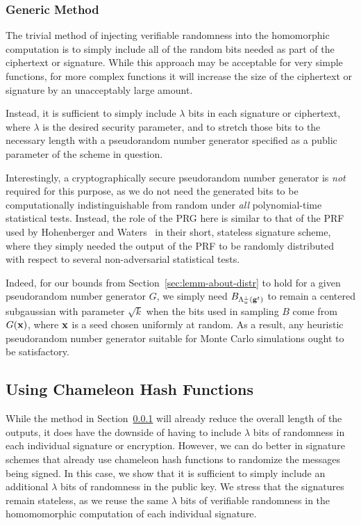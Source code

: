 \subsubsection{Generic Method}
\label{sec:generic-method}
The trivial method of injecting verifiable randomness into the
homomorphic computation is to simply include all of the random bits
needed as part of the ciphertext or signature. While this approach may
be acceptable for very simple functions, for more complex functions it
will increase the size of the ciphertext or signature by an
unacceptably large amount. 

Instead, it is sufficient to simply include $\lambda$ bits in each
signature or ciphertext, where
$\lambda$ is the desired security parameter, and to stretch those bits
to the necessary length with a pseudorandom number generator specified as a
public parameter of the scheme in question. 

Interestingly, a cryptographically secure pseudorandom number
generator is \emph{not} required for this purpose, as we do not need
the generated bits to be computationally indistinguishable from random
under \emph{all} polynomial-time statistical tests. Instead, the role
of the PRG here is similar to that of the PRF used by Hohenberger and
Waters~\cite{DBLP:conf/crypto/HohenbergerW09} in their short,
stateless signature scheme, where they simply needed the output of the
PRF to be randomly distributed with respect to several non-adversarial
statistical tests.

Indeed, for our bounds from Section~\ref{sec:lemm-about-distr} to hold for
a given pseudorandom number generator $G$, we simply need
$B_{\Lambda^{\perp}_{u}(\mathbf{g}^t)}$ to remain a centered subgaussian with
parameter $\sqrt{k}$ when the bits used in sampling $B$ come from
$G(\mathbf{x})$, where $\mathbf{x}$ is a seed chosen uniformly at random. As a
result, any heuristic pseudorandom number generator suitable for Monte
Carlo simulations ought to be satisfactory.

\subsection{Using  Chameleon Hash Functions}
\label{sec:using-chameleon-hash}

While the method in Section~\ref{sec:generic-method} will already
reduce the overall length of the outputs, it does have the downside of
having to include $\lambda$ bits of randomness in each individual
signature or encryption. However, we can do better in signature
schemes that already use chameleon hash functions to randomize the
messages being signed. In this case, we show that it is sufficient to
simply include an additional $\lambda$ bits of randomness in the
public key. We stress that the signatures remain stateless, as we
reuse the same $\lambda$ bits of verifiable randomness in the
homomomorphic computation of each individual signature. 

